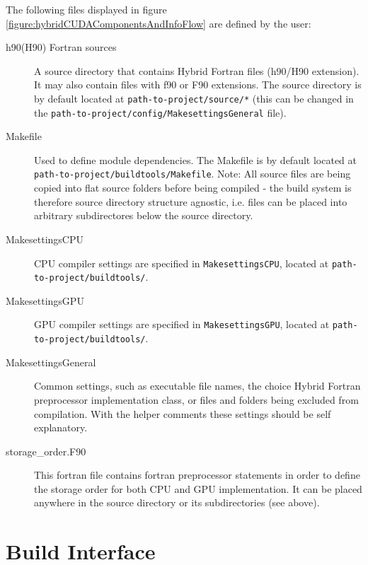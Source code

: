 The following files displayed in figure \ref{figure:hybridCUDAComponentsAndInfoFlow} are defined by the user:

\begin{description}
 \item[h90(H90) Fortran sources] A source directory that contains Hybrid Fortran files (h90/H90 extension). It may also contain files with f90 or F90 extensions. The source directory is by default located at \verb|path-to-project/source/*| (this can be changed in the \verb|path-to-project/config/MakesettingsGeneral| file).
 \item[Makefile] Used to define module dependencies. The Makefile is by default located at \verb|path-to-project/buildtools/Makefile|. Note: All source files are being copied into flat source folders before being compiled - the build system is therefore source directory structure agnostic, i.e. files can be placed into arbitrary subdirectores below the source directory.
  \item[MakesettingsCPU] CPU compiler settings are specified in \verb|MakesettingsCPU|, located at \verb|path-to-project/buildtools/|.
  \item[MakesettingsGPU] GPU compiler settings are specified in \verb|MakesettingsGPU|, located at \verb|path-to-project/buildtools/|.
  \item[MakesettingsGeneral] Common settings, such as executable file names, the choice Hybrid Fortran preprocessor implementation class, or files and folders being excluded from compilation. With the helper comments these settings should be self explanatory.
 \item[storage\_order.F90] This fortran file contains fortran preprocessor statements in order to define the storage order for both CPU and GPU implementation. It can be placed anywhere in the source directory or its subdirectories (see above).
\end{description}

\section{Build Interface} \label{sub:buildInterface}

